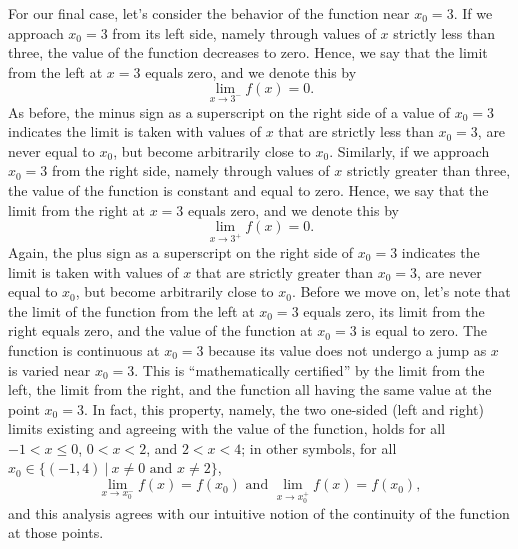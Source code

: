 For our final case, let's consider the behavior of the function near $x_0=3$.  If we approach $x_0=3$ from its left side, namely through values of $x$ strictly less than three, the value of the function decreases to zero. Hence, we say that the limit from the left at $x=3$ equals zero, and we denote this by
\begin{equation}
    \lim_{x \to 3^-} f(x) = 0.
\end{equation}
As before, the minus sign as a superscript on the right side of a value of $x_0=3$ indicates the limit is taken with values of $x$ that are strictly less than $x_0=3$, are never equal to $x_0$, but become arbitrarily close to $x_0$. Similarly, if we approach $x_0=3$ from the right side, namely through values of $x$ strictly greater than three, the value of the function is constant and equal to zero. Hence, we say that the limit from the right at $x=3$ equals zero, and we denote this by
\begin{equation}
    \lim_{x \to 3^+} f(x) = 0.
\end{equation}
Again, the plus sign as a superscript on the right side of $x_0=3$ indicates the limit is taken with values of $x$ that are strictly greater than $x_0=3$, are never equal to $x_0$, but become arbitrarily close to $x_0$. Before we move on, let's note that the limit of the function from the left at $x_0=3$ equals zero, its limit from the right equals zero, and the value of the function at $x_0=3$ is equal to zero. The function is continuous at $x_0=3$ because its value does not undergo a jump as $x$ is varied near $x_0=3$. This is ``mathematically certified'' by the limit from the left, the limit from the right, and the function all having the same value at the point $x_0=3$. In fact, this property, namely, the two one-sided (left and right) limits existing and agreeing with the value of the function, holds for all $-1 < x \le 0$, $0 < x < 2$, and $2 < x < 4$; in other symbols, for all $x_0 \in \{ (-1, 4)~|~ x\neq 0 \text{ and } x\neq 2\}$, 
\[  \lim_{x \to x_0^-} f(x) = f(x_0) \text{ and } \lim_{x \to x_0^+} f(x) = f(x_0),\]
and this analysis agrees with our intuitive notion of the continuity of the function at those points. 


\bigskip

